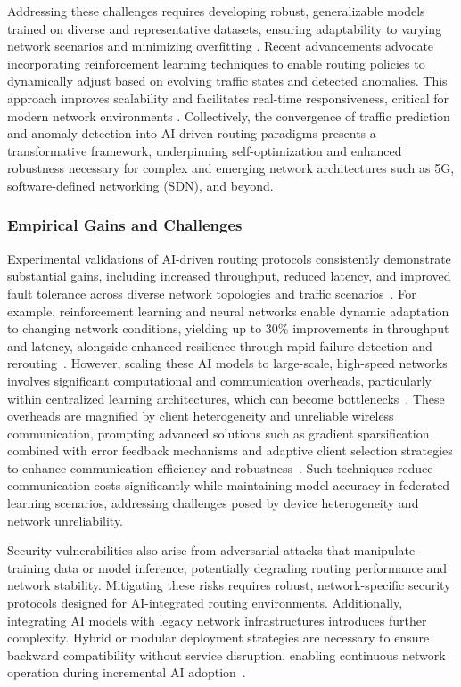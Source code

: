 \documentclass[sigconf]{acmart}
\begin{document}
Addressing these challenges requires developing robust, generalizable models trained on diverse and representative datasets, ensuring adaptability to varying network scenarios and minimizing overfitting \cite{ref50}. Recent advancements advocate incorporating reinforcement learning techniques to enable routing policies to dynamically adjust based on evolving traffic states and detected anomalies. This approach improves scalability and facilitates real-time responsiveness, critical for modern network environments \cite{ref53}. Collectively, the convergence of traffic prediction and anomaly detection into AI-driven routing paradigms presents a transformative framework, underpinning self-optimization and enhanced robustness necessary for complex and emerging network architectures such as 5G, software-defined networking (SDN), and beyond.

\subsubsection{Empirical Gains and Challenges}

Experimental validations of AI-driven routing protocols consistently demonstrate substantial gains, including increased throughput, reduced latency, and improved fault tolerance across diverse network topologies and traffic scenarios~\cite{ref4}. For example, reinforcement learning and neural networks enable dynamic adaptation to changing network conditions, yielding up to 30\% improvements in throughput and latency, alongside enhanced resilience through rapid failure detection and rerouting~\cite{ref53}. However, scaling these AI models to large-scale, high-speed networks involves significant computational and communication overheads, particularly within centralized learning architectures, which can become bottlenecks~\cite{ref53}. These overheads are magnified by client heterogeneity and unreliable wireless communication, prompting advanced solutions such as gradient sparsification combined with error feedback mechanisms and adaptive client selection strategies to enhance communication efficiency and robustness~\cite{ref4}. Such techniques reduce communication costs significantly while maintaining model accuracy in federated learning scenarios, addressing challenges posed by device heterogeneity and network unreliability.

Security vulnerabilities also arise from adversarial attacks that manipulate training data or model inference, potentially degrading routing performance and network stability. Mitigating these risks requires robust, network-specific security protocols designed for AI-integrated routing environments. Additionally, integrating AI models with legacy network infrastructures introduces further complexity. Hybrid or modular deployment strategies are necessary to ensure backward compatibility without service disruption, enabling continuous network operation during incremental AI adoption~\cite{ref48}.
\end{document}
